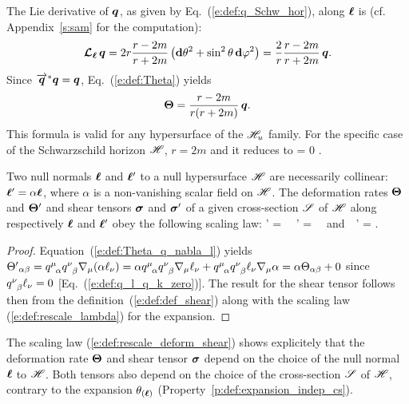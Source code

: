 \begin{example} \label{x:def:Schw_hor8}
The Lie derivative of $\bm{q}$, as given by Eq.~(\ref{e:def:q_Schw_hor}),
along $\bm{\ell}$ is (cf. Appendix~\ref{s:sam} for the computation):
\[
    \bm{\mathcal{L}}_{\bm{\bm{\ell}}}\, \bm{q} =  2 r \frac{r-2m}{r+2m} \left( \mathbf{d}\theta^2
        +  \sin^2\theta \, \mathbf{d}\varphi^2 \right) = \frac{2}{r} \frac{r-2m}{r+2m}
            \, \bm{q} .
\]
Since $\overrightarrow{\bm{q}}^* \bm{q} = \bm{q}$, Eq.~(\ref{e:def:Theta}) yields
\[
    \bm{\Theta} = \frac{r-2m}{r(r+2m)} \, \bm{q} .
\]
This formula is valid for any hypersurface of the $\mathscr{H}_u$ family. For the specific
case of the Schwarzschild horizon $\mathscr{H}$, $r=2m$ and it reduces to
\be \label{e:def:Theta_zero_Schw_hor}
    \w{\Theta} = 0 .
\ee
\end{example}

\begin{prop}
Two null normals $\bm{\ell}$ and $\bm{\ell}'$ to a null hypersurface $\mathscr{H}$ are necessarily collinear:
$\bm{\ell}' = \alpha \bm{\ell}$, where $\alpha$ is a non-vanishing scalar field on $\mathscr{H}$.
The deformation rates $\bm{\Theta}$ and $\bm{\Theta}'$ and shear tensors
$\bm{\sigma}$ and $\bm{\sigma}'$ of a given cross-section $\mathscr{S}$
of $\mathscr{H}$ along respectively $\bm{\ell}$ and $\bm{\ell}'$ obey the following scaling law:
\be \label{e:def:rescale_deform_shear}
   \wl' = \alpha \wl \ \Longrightarrow \ \w{\Theta}' = \alpha \w{\Theta}
   \ \ \mbox{and}\  \ \w{\sigma}' = \alpha \w{\sigma} .
\ee
\end{prop}
\begin{proof}
Equation~(\ref{e:def:Theta_q_nabla_l}) yields
${\Theta'}_{\alpha\beta}  = q^\mu_{\ \, \alpha} q^\nu_{\ \, \beta} \nabla_\mu (\alpha \ell_\nu) =
\alpha q^\mu_{\ \, \alpha} q^\nu_{\ \, \beta} \nabla_\mu \ell_\nu
+ q^\mu_{\ \, \alpha} q^\nu_{\ \, \beta} \ell_\nu \nabla_\mu \alpha = \alpha \Theta_{\alpha\beta} + 0$
since $q^\nu_{\ \, \beta} \ell_\nu = 0$ [Eq.~(\ref{e:def:q_l_q_k_zero})].
The result for the shear tensor follows then from the definition~(\ref{e:def:def_shear}) along
with the scaling law (\ref{e:def:rescale_lambda}) for the expansion.
\end{proof}

\begin{remark}
\label{r:def:shear_dep_cs}
The scaling law (\ref{e:def:rescale_deform_shear}) shows explicitely that the deformation rate $\bm{\Theta}$
and shear tensor $\bm{\sigma}$ depend on the choice of the null normal $\bm{\ell}$ to $\mathscr{H}$.
Both tensors also depend on the choice of the cross-section $\mathscr{S}$ of $\mathscr{H}$,
contrary to the expansion $\theta_{(\bm{\ell})}$ (Property~\ref{p:def:expansion_indep_cs}).
\end{remark}

